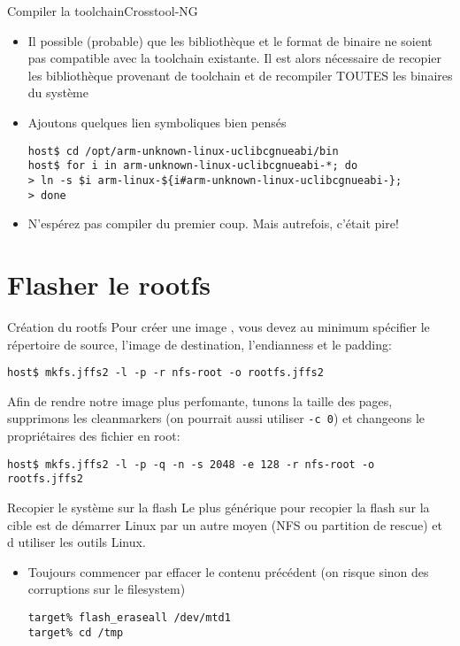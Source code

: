 \begin{frame}[fragile=singleslide]{Compiler la toolchain}{Crosstool-NG}
  \begin{itemize}
      \item Il  possible (probable) que les bibliothèque  et le format
        de  binaire  ne  soient   pas  compatible  avec  la  toolchain
        existante.    Il  est   alors  nécessaire   de   recopier  les
        bibliothèque  provenant de toolchain  et de  recompiler TOUTES
        les binaires du système
      \item Ajoutons quelques lien symboliques bien pensés
       \begin{lstlisting}[basicstyle=\ttfamily\scriptsize\color{colBasic}]
host$ cd /opt/arm-unknown-linux-uclibcgnueabi/bin
host$ for i in arm-unknown-linux-uclibcgnueabi-*; do 
> ln -s $i arm-linux-${i#arm-unknown-linux-uclibcgnueabi-}; 
> done
	\end{lstlisting}
      \item N'espérez  pas compiler  du premier coup.  Mais autrefois,
        c'était pire!
      \end{itemize}
\end{frame}


\section{Flasher le rootfs}

\begin{frame}[fragile=singleslide]{Création du rootfs}
  Pour créer une image , vous devez au minimum spécifier le
  répertoire  de source,  l'image de  destination, l'endianness  et le
  padding:
  \begin{lstlisting} 
host$ mkfs.jffs2 -l -p -r nfs-root -o rootfs.jffs2
  \end{lstlisting}
  Afin de  rendre notre  image plus perfomante,  tunons la  taille des
  pages,  supprimons  les  cleanmarkers  (on pourrait  aussi  utiliser
  \verb+-c 0+) et changeons le propriétaires des fichier en root:
  \begin{lstlisting} 
host$ mkfs.jffs2 -l -p -q -n -s 2048 -e 128 -r nfs-root -o rootfs.jffs2
  \end{lstlisting}
\end{frame}

\begin{frame}[fragile=singleslide]{Recopier le système sur la flash}
  Le  plus  générique pour  recopier  la flash  sur  la  cible est  de
  démarrer Linux par un autre moyen  (NFS ou partition de rescue) et d
  utiliser les outils Linux.
  \begin{itemize} 
  \item Toujours commencer par effacer le contenu précédent (on risque
    sinon des corruptions sur le filesystem)
    \begin{lstlisting}
target% flash_eraseall /dev/mtd1
target% cd /tmp
    \end{lstlisting}
  \end{itemize}
\end{frame}

